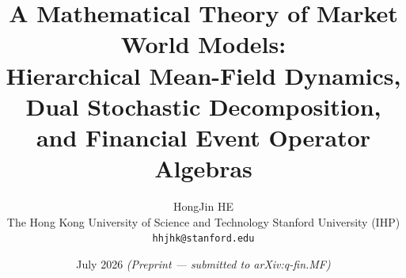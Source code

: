 \documentclass[12pt,a4paper]{article}
\theoremstyle{plain}
\theoremstyle{definition}
\newcommand{\1}{\mathbbm{1}}
\begin{document}

\title{\Large\bfseries A Mathematical Theory of Market World Models:\\[6pt]
Hierarchical Mean-Field Dynamics, Dual Stochastic Decomposition,\\
and Financial Event Operator Algebras}

\author{
  HongJin HE\\[6pt]
  \small The Hong Kong University of Science and Technology \quad
         Stanford University (IHP)\\[3pt]
  \small \texttt{hhjhk@stanford.edu}
}

\date{\small July 2026 \quad \textit{(Preprint — submitted to arXiv:q-fin.MF)}}

\maketitle
\end{document}
